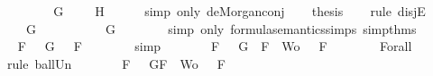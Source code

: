 \begin{isabellebody}
\ \ \isamarkupfalse%
\ \isamarkupfalse%
\ {\isachardoublequoteopen}{\isasymnot}\ {\isacharparenleft}{\isasymA}\ {\isasymTurnstile}\ G{\isacharparenright}\ {\isasymor}\ {\isasymnot}\ {\isacharparenleft}{\isasymA}\ {\isasymTurnstile}\ H{\isacharparenright}{\isachardoublequoteclose}\isanewline
\ \ \ \ \isamarkupfalse%
\ {\isacharparenleft}simp\ only{\isacharcolon}\ de{\isacharunderscore}Morgan{\isacharunderscore}conj{\isacharparenright}\isanewline
\ \ \isamarkupfalse%
\ {\isacharquery}thesis\isanewline
\ \ \isamarkupfalse%
\ {\isacharparenleft}rule\ disjE{\isacharparenright}\isanewline
\ \ \ \ \isamarkupfalse%
\ {\isachardoublequoteopen}{\isasymnot}\ {\isacharparenleft}{\isasymA}\ {\isasymTurnstile}\ G{\isacharparenright}{\isachardoublequoteclose}\isanewline
\ \ \ \ \isamarkupfalse%
\ \isamarkupfalse%
\ {\isachardoublequoteopen}{\isasymA}\ {\isasymTurnstile}\ \isactrlbold {\isasymnot}\ G{\isachardoublequoteclose}\isanewline
\ \ \ \ \ \ \isamarkupfalse%
\ {\isacharparenleft}simp\ only{\isacharcolon}\ formula{\isacharunderscore}semantics{\isachardot}simps{\isacharparenleft}{}{\isacharparenright}\ simp{\isacharunderscore}thms{\isacharparenleft}{}{\isacharparenright}{\isacharparenright}\isanewline
\ \ \ \ \isamarkupfalse%
\ \isamarkupfalse%
\ {\isachardoublequoteopen}{\isasymforall}F\ {\isasymin}\ {\isacharbraceleft}\isactrlbold {\isasymnot}\ G{\isacharbraceright}{\isachardot}\ {\isasymA}\ {\isasymTurnstile}\ F{\isachardoublequoteclose}\isanewline
\ \ \ \ \ \ \isamarkupfalse%
\ simp\isanewline
\ \ \ \ \isamarkupfalse%
\ \isamarkupfalse%
\ {\isachardoublequoteopen}{\isasymforall}F\ {\isasymin}\ {\isacharparenleft}{\isacharbraceleft}\isactrlbold {\isasymnot}\ G{\isacharbraceright}\ {\isasymunion}\ {\isacharparenleft}{\isacharbraceleft}F{\isacharbraceright}\ {\isasymunion}\ Wo{\isacharparenright}{\isacharparenright}{\isachardot}\ {\isasymA}\ {\isasymTurnstile}\ F{\isachardoublequoteclose}\isanewline
\ \ \ \ \ \ \isamarkupfalse%
\ Forall{}\ \isamarkupfalse%
\ {\isacharparenleft}rule\ ball{\isacharunderscore}Un{\isacharparenright}\isanewline
\ \ \ \ \isamarkupfalse%
\ \isamarkupfalse%
\ {\isachardoublequoteopen}{\isasymforall}F\ {\isasymin}\ {\isacharbraceleft}\isactrlbold {\isasymnot}\ G{\isacharcomma}F{\isacharbraceright}\ {\isasymunion}\ Wo{\isachardot}\ {\isasymA}\ {\isasymTurnstile}\ F{\isachardoublequoteclose}\isanewline

\end{isabellebody}

